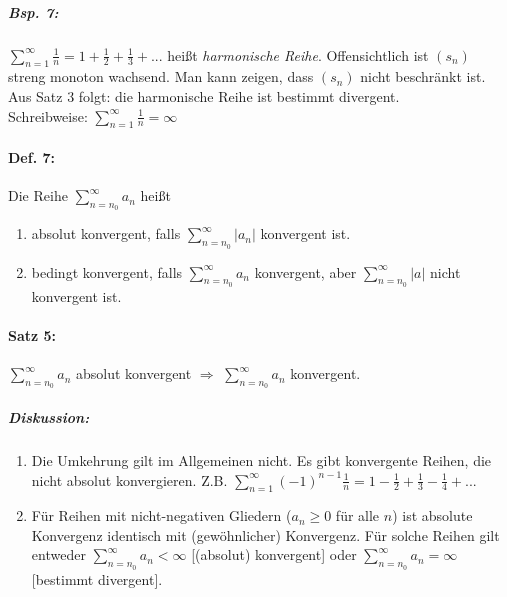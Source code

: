 \subparagraph{Bsp. 7:} $\sum_{n=1}^\infty \frac{1}{n}=1+\frac{1}{2}+\frac{1}{3}+...$ heißt \emph{harmonische Reihe}. Offensichtlich ist $(s_n)$ streng monoton wachsend. Man kann zeigen, dass $(s_n)$ nicht beschränkt ist. Aus Satz 3 folgt: die harmonische Reihe ist bestimmt divergent.\\
Schreibweise: $\sum_{n=1}^\infty \frac{1}{n}=\infty$

\paragraph{Def. 7:} Die Reihe $\sum_{n=n_0}^\infty a_n$ heißt
\begin{enumerate}[label=(\alph*)]
\item absolut konvergent, falls $\sum_{n=n_0}^\infty|a_n|$ konvergent ist.
\item bedingt konvergent, falls $\sum_{n=n_0}^\infty a_n$ konvergent, aber $\sum_{n=n_0}^\infty |a|$ nicht konvergent ist.
\end{enumerate}

\paragraph{Satz 5:} $\sum_{n=n_0}^\infty a_n$ absolut konvergent $\Rightarrow$ $\sum_{n=n_0}^\infty a_n$ konvergent.
\subparagraph{Diskussion:}
\begin{enumerate}
\item Die Umkehrung gilt im Allgemeinen nicht. Es gibt konvergente Reihen, die nicht absolut konvergieren. Z.B. $\sum_{n=1}^\infty (-1)^{n-1}\frac{1}{n}=1-\frac{1}{2}+\frac{1}{3}-\frac{1}{4}+...$
\item Für Reihen mit nicht-negativen Gliedern ($a_n \geq 0$ für alle $n$) ist absolute Konvergenz identisch mit (gewöhnlicher) Konvergenz. Für solche Reihen gilt entweder $\sum_{n=n_0}^\infty a_n<\infty$ [(absolut) konvergent] oder $\sum_{n=n_0}^\infty a_n = \infty$ [bestimmt divergent].
\end{enumerate}

